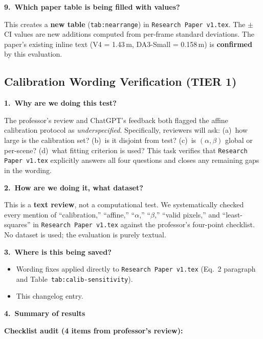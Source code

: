 \documentclass[11pt,a4paper]{article}
\begin{document}
\textbf{9.\ Which paper table is being filled with values?}

This creates a \textbf{new table} (\texttt{tab:nearrange}) in
\texttt{Research Paper v1.tex}. The $\pm$ CI values are new
additions computed from per-frame standard deviations. The paper's
existing inline text (V4 = 1.43\,m, DA3-Small = 0.158\,m) is
\textbf{confirmed} by this evaluation.

\subsection{Calibration Wording Verification (TIER 1)}
\label{sec:calibration-verify}

\textbf{1.\ Why are we doing this test?}

The professor's review and ChatGPT's feedback both flagged the affine
calibration protocol as \emph{underspecified}. Specifically, reviewers
will ask: (a)~how large is the calibration set? (b)~is it disjoint
from test? (c)~is $(\alpha,\beta)$ global or per-scene? (d)~what
fitting criterion is used? This task verifies that \texttt{Research
Paper v1.tex} explicitly answers all four questions and closes any
remaining gaps in the wording.

\textbf{2.\ How are we doing it, what dataset?}

This is a \textbf{text review}, not a computational test. We
systematically checked every mention of ``calibration,'' ``affine,''
``$\alpha$,'' ``$\beta$,'' ``valid pixels,'' and ``least-squares'' in
\texttt{Research Paper v1.tex} against the professor's four-point
checklist. No dataset is used; the evaluation is purely textual.

\textbf{3.\ Where is this being saved?}

\begin{itemize}[nosep]
  \item Wording fixes applied directly to
    \texttt{Research Paper v1.tex} (Eq.~2 paragraph and
    Table~\texttt{tab:calib-sensitivity}).
  \item This changelog entry.
\end{itemize}

\textbf{4.\ Summary of results}

\textbf{Checklist audit (4 items from professor's review):}
\end{document}
